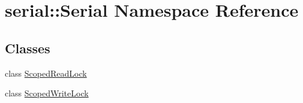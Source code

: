 \hypertarget{namespaceserial_1_1_serial}{}\section{serial\+:\+:Serial Namespace Reference}
\label{namespaceserial_1_1_serial}
\subsection*{Classes}
\begin{DoxyCompactItemize}
\item 
class \hyperlink{class_serial_1_1_scoped_read_lock}{Scoped\+Read\+Lock}
\item 
class \hyperlink{class_serial_1_1_scoped_write_lock}{Scoped\+Write\+Lock}
\end{DoxyCompactItemize}
